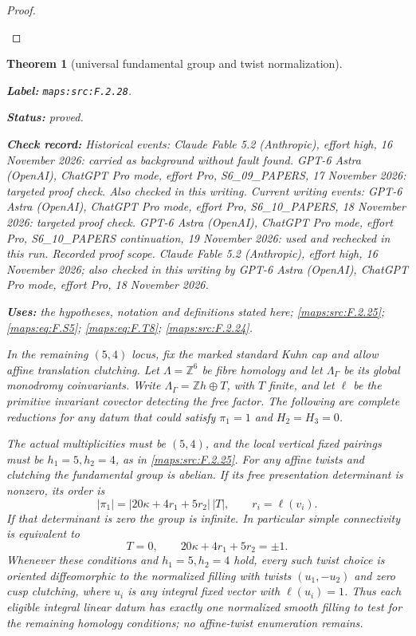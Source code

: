 \documentclass[11pt,a4paper]{article}
\newtheorem{theorem}{Theorem}[section]
\theoremstyle{definition}
\newcommand{\StatementRecord}[4]{\par\smallskip\begingroup\upshape\raggedright\noindent\textbf{Label:} \nolinkurl{#1}.\par\noindent\textbf{Status:} #2.\par\noindent\textbf{Check record:} #3.\par\noindent\textbf{Uses:} #4.\par\endgroup\smallskip}
\begin{document}
\begin{proof}
\begin{enumerate}[label=\arabic*.]
\end{enumerate}
\end{proof}




\begin{theorem}[universal fundamental group and twist normalization]\label{maps:src:F.2.28}
\StatementRecord{maps:src:F.2.28}{proved}{Historical events: Claude Fable 5.2 (Anthropic), effort high, 16 November 2026: carried as background without fault found. GPT-6 Astra (OpenAI), ChatGPT Pro mode, effort Pro, S6\_09\_PAPERS, 17 November 2026: targeted proof check. Also checked in this writing. Current writing events: GPT-6 Astra (OpenAI), ChatGPT Pro mode, effort Pro, S6\_10\_PAPERS, 18 November 2026: targeted proof check. GPT-6 Astra (OpenAI), ChatGPT Pro mode, effort Pro, S6\_10\_PAPERS continuation, 19 November 2026: used and rechecked in this run. \emph{Recorded proof scope.} Claude Fable 5.2 (Anthropic), effort high, 16 November 2026; also checked in this writing by GPT-6 Astra (OpenAI), ChatGPT Pro mode, effort Pro, 18 November 2026}{the hypotheses, notation and definitions stated here; \cref{maps:src:F.2.25}; \cref{maps:eq:F.S5}; \cref{maps:eq:F.T8}; \cref{maps:src:F.2.24}}


In the remaining $(5,4)$ locus, fix the marked standard Kuhn
cap and allow affine translation clutching.
Let $\Lambda=\mathbb Z^6$ be fibre homology and let
$\Lambda_\Gamma$ be its global monodromy coinvariants.
Write $\Lambda_\Gamma=\mathbb Zh\oplus T$, with $T$ finite,
and let $\ell$ be the primitive invariant covector detecting
the free factor.  The following are complete reductions for
any datum that could satisfy $\pi_1=1$ and $H_2=H_3=0$.

The actual multiplicities must be $(5,4)$, and the local
vertical fixed pairings must be $h_1=5,h_2=4$, as in \ref{maps:src:F.2.25}.
For any affine twists and clutching the fundamental group
is abelian.  If its free presentation determinant is nonzero,
its order is
\[
 |\pi_1|=|20\kappa+4r_1+5r_2|\,|T|,
 \qquad r_i=\ell(v_i).
 \tag{F.T11}\label{maps:eq:F.T11}
\]
If that determinant is zero the group is infinite.
In particular simple connectivity is equivalent to
\[
 T=0,\qquad 20\kappa+4r_1+5r_2=\pm1.
 \tag{F.T12}\label{maps:eq:F.T12}
\]
Whenever these conditions and $h_1=5,h_2=4$ hold, every
such twist choice is oriented diffeomorphic to the normalized
filling with twists $(u_1,-u_2)$ and zero cusp clutching,
where $u_i$ is any integral fixed vector with $\ell(u_i)=1$.
Thus each eligible integral linear datum has exactly one
normalized smooth filling to test for the remaining
homology conditions; no affine-twist enumeration remains.

\end{theorem}
\end{document}
